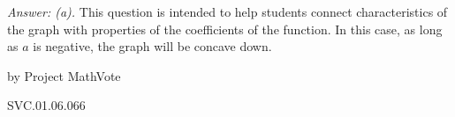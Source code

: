 {\it Answer: (a).}  This question is intended to help students connect characteristics of the graph with properties of the coefficients of the function.  In this case, as long as $a$ is negative, the graph will be concave down.

\medskip
by Project MathVote

SVC.01.06.066

